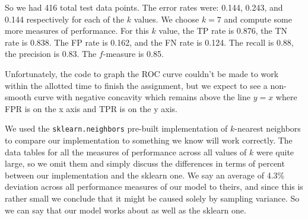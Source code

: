 \documentclass[11pt,oneside,reqno]{amsart}
\theoremstyle{plain}
\theoremstyle{definition}
\theoremstyle{remark}
\newcommand{\inlinecode}{\texttt}
\begin{document}
So we had 416 total test data points. The error rates were: 0.144, 0.243, and 0.144 respectively for each of the $k$ values. We choose $k = 7$ and compute some more measures of performance. For this $k$ value, the TP rate is 0.876, the TN rate is 0.838. The FP rate is 0.162, and the FN rate is 0.124. The recall is 0.88, the precision is 0.83. The $f$-measure is 0.85. 

Unfortunately, the code to graph the ROC curve couldn't be made to work within the allotted time to finish the assignment, but we expect to see a non-smooth curve with negative concavity which remains above the line $y =x$ where FPR is on the x axis and TPR is on the y axis. 

We used the \inlinecode{sklearn.neighbors} pre-built implementation of $k$-nearest neighbors to compare our implementation to something we know will work correctly. The data tables for all the measures of performance across all values of $k$ were quite large, so we omit them and simply discuss the differences in terms of percent between our implementation and the sklearn one. We say an average of 4.3\% deviation across all performance measures of our model to theirs, and since this is rather small we conclude that it might be caused solely by sampling variance. So we can say that our model works about as well as the sklearn one. 
\end{document}
